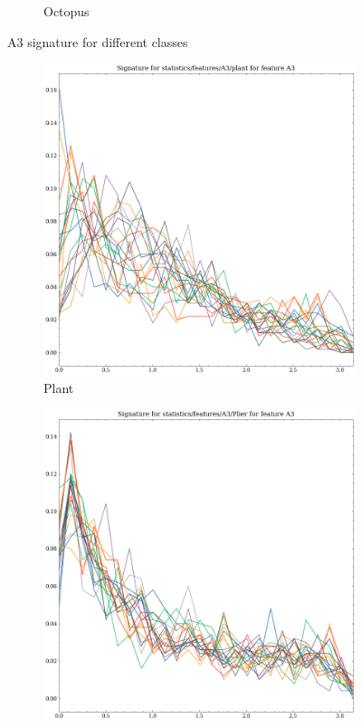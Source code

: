 \begin{figure}[ht]
\begin{subfigure}[b]{0.23\textwidth}
        \caption{Octopus}
        \label{fig:features-statistics-A3-t}    
    \end{subfigure}
    \hfill
    \caption{A3 signature for different classes}
    \label{fig:A3-signatures-1}
\end{figure}

\begin{figure}[ht]
    \centering
      \begin{subfigure}[b]{0.23\textwidth}
        \includegraphics[width=\textwidth]{assets/feature_extraction/A3/plant.png}
        \caption{Plant}
        \label{fig:features-statistics-A3-u}    
    \end{subfigure}
    \hfill
    \begin{subfigure}[b]{0.23\textwidth}
        \includegraphics[width=\textwidth]{assets/feature_extraction/A3/Plier.png}

\end{subfigure}
\end{figure}
